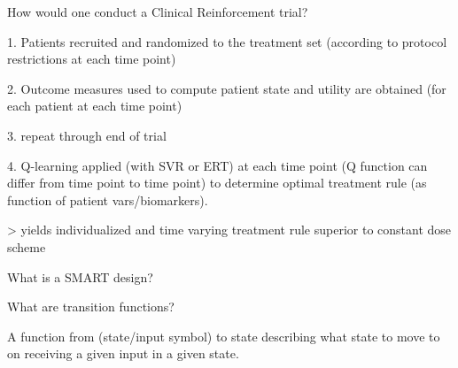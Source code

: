 \documentclass[10pt]{article}
\begin{document}
\hrulefill

How would one conduct a Clinical Reinforcement trial?

1. Patients recruited and randomized to the treatment set (according to protocol restrictions at each time point)

2. Outcome measures used to compute patient state and utility are obtained (for each patient at each time point)

3. repeat through end of trial

4. Q-learning applied (with SVR or ERT) at each time point (Q function can differ from time point to time point) to determine optimal treatment rule (as function of patient vars/biomarkers).

> yields individualized and time varying treatment rule superior to constant dose scheme


\hrulefill

What is a SMART design?
	
\hrulefill

What are transition functions?

A function from (state/input symbol) to state describing what state to move to on receiving a given input in a given state.
\end{document}
